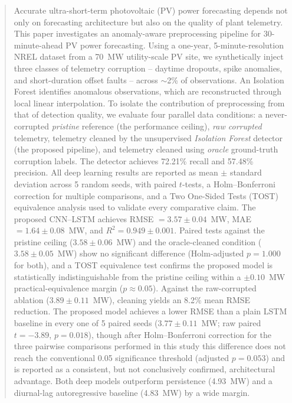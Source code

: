 \documentclass[conference]{IEEEtran}
\begin{document}
\begin{abstract}
Accurate ultra-short-term photovoltaic (PV) power forecasting depends not only on forecasting architecture but also on the quality of plant telemetry. This paper investigates an anomaly-aware preprocessing pipeline for 30-minute-ahead PV power forecasting. Using a one-year, 5-minute-resolution NREL dataset from a 70~MW utility-scale PV site, we synthetically inject three classes of telemetry corruption -- daytime dropouts, spike anomalies, and short-duration offset faults -- across $\sim$2\% of observations. An Isolation Forest identifies anomalous observations, which are reconstructed through local linear interpolation. To isolate the contribution of preprocessing from that of detection quality, we evaluate four parallel data conditions: a never-corrupted \emph{pristine} reference (the performance ceiling), \emph{raw corrupted} telemetry, telemetry cleaned by the unsupervised \emph{Isolation Forest} detector (the proposed pipeline), and telemetry cleaned using \emph{oracle} ground-truth corruption labels. The detector achieves 72.21\% recall and 57.48\% precision. All deep learning results are reported as mean $\pm$ standard deviation across 5 random seeds, with paired $t$-tests, a Holm--Bonferroni correction for multiple comparisons, and a Two One-Sided Tests (TOST) equivalence analysis used to validate every comparative claim. The proposed CNN--LSTM achieves RMSE $= 3.57 \pm 0.04$~MW, MAE $= 1.64 \pm 0.08$~MW, and $R^2 = 0.949 \pm 0.001$. Paired tests against the pristine ceiling ($3.58 \pm 0.06$~MW) and the oracle-cleaned condition ($3.58 \pm 0.05$~MW) show no significant difference (Holm-adjusted $p = 1.000$ for both), and a TOST equivalence test confirms the proposed model is statistically indistinguishable from the pristine ceiling within a $\pm 0.10$~MW practical-equivalence margin ($p \approx 0.05$). Against the raw-corrupted ablation ($3.89 \pm 0.11$~MW), cleaning yields an 8.2\% mean RMSE reduction. The proposed model achieves a lower RMSE than a plain LSTM baseline in every one of 5 paired seeds ($3.77 \pm 0.11$~MW; raw paired $t=-3.89$, $p=0.018$), though after Holm--Bonferroni correction for the three pairwise comparisons performed in this study this difference does not reach the conventional 0.05 significance threshold (adjusted $p = 0.053$) and is reported as a consistent, but not conclusively confirmed, architectural advantage. Both deep models outperform persistence (4.93~MW) and a diurnal-lag autoregressive baseline (4.83~MW) by a wide margin.
\end{abstract}
\end{document}
